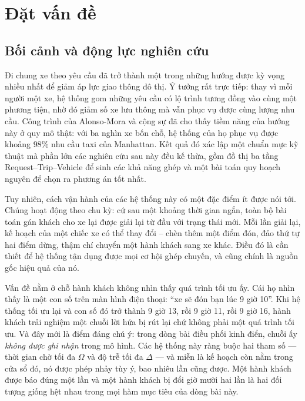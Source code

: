 \chapter{Đặt vấn đề}

\section{Bối cảnh và động lực nghiên cứu}

Đi chung xe theo yêu cầu đã trở thành một trong những hướng được kỳ vọng nhiều nhất để giảm
áp lực giao thông đô thị. Ý tưởng rất trực tiếp: thay vì mỗi người một xe, hệ thống gom những
yêu cầu có lộ trình tương đồng vào cùng một phương tiện, nhờ đó giảm số xe lưu thông mà vẫn
phục vụ được cùng lượng nhu cầu. Công trình của Alonso-Mora và cộng sự \cite{alonsomora2017}
đã cho thấy tiềm năng của hướng này ở quy mô thật: với ba nghìn xe bốn chỗ, hệ thống của họ
phục vụ được khoảng $98\%$ nhu cầu taxi của Manhattan. Kết quả đó xác lập một chuẩn mực kỹ
thuật mà phần lớn các nghiên cứu sau này đều kế thừa, gồm đồ thị ba tầng Request--Trip--Vehicle
để sinh các khả năng ghép và một bài toán quy hoạch nguyên để chọn ra phương án tốt nhất.

Tuy nhiên, cách vận hành của các hệ thống này có một đặc điểm ít được nói tới. Chúng hoạt động
theo chu kỳ: cứ sau một khoảng thời gian ngắn, toàn bộ bài toán gán khách cho xe lại được giải
lại từ đầu với trạng thái mới. Mỗi lần giải lại, kế hoạch của một chiếc xe có thể thay đổi --
chèn thêm một điểm đón, đảo thứ tự hai điểm dừng, thậm chí chuyển một hành khách sang xe khác.
Điều đó là cần thiết để hệ thống tận dụng được mọi cơ hội ghép chuyến, và cũng chính là nguồn
gốc hiệu quả của nó.

Vấn đề nằm ở chỗ hành khách không nhìn thấy quá trình tối ưu ấy. Cái họ nhìn thấy là một con
số trên màn hình điện thoại: ``xe sẽ đón bạn lúc 9 giờ 10''. Khi hệ thống tối ưu lại và con số
đó trở thành 9 giờ 13, rồi 9 giờ 11, rồi 9 giờ 16, hành khách trải nghiệm một chuỗi lời hứa bị
rút lại chứ không phải một quá trình tối ưu. Và đây mới là điểm đáng chú ý: trong dòng bài điều
phối kinh điển, chuỗi ấy \emph{không được ghi nhận} trong mô hình. Các hệ thống này ràng buộc
hai tham số --- thời gian chờ tối đa $\Omega$ và độ trễ tối đa $\Delta$ --- và miễn là kế hoạch
còn nằm trong cửa sổ đó, nó được phép nhảy tùy ý, bao nhiêu lần cũng được. Một hành khách được
báo đúng một lần và một hành khách bị đổi giờ mười hai lần là hai đối tượng giống hệt nhau
trong mọi hàm mục tiêu của dòng bài này.

